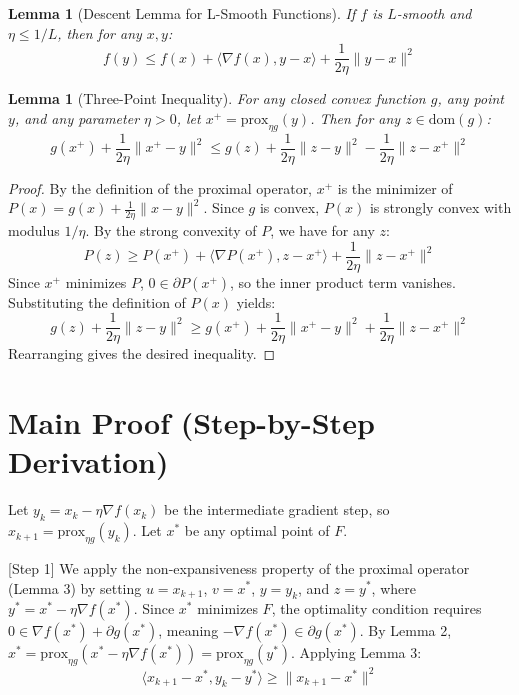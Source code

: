 \documentclass{article}
\newtheorem{lemma}[theorem]{Lemma}
\begin{document}
\begin{lemma}[Descent Lemma for L-Smooth Functions]
If $f$ is $L$-smooth and $\eta \leq 1/L$, then for any $x, y$:
\begin{equation}
f(y) \leq f(x) + \langle \nabla f(x), y - x \rangle + \frac{1}{2\eta} \|y - x\|^2
\end{equation}
\end{lemma}

\begin{lemma}[Three-Point Inequality]
For any closed convex function $g$, any point $y$, and any parameter $\eta > 0$, let $x^+ = \text{prox}_{\eta g}(y)$. Then for any $z \in \text{dom}(g)$:
\begin{equation}
g(x^+) + \frac{1}{2\eta}\|x^+ - y\|^2 \leq g(z) + \frac{1}{2\eta}\|z - y\|^2 - \frac{1}{2\eta}\|z - x^+\|^2
\end{equation}
\end{lemma}

\begin{proof}
By the definition of the proximal operator, $x^+$ is the minimizer of $P(x) = g(x) + \frac{1}{2\eta}\|x - y\|^2$. Since $g$ is convex, $P(x)$ is strongly convex with modulus $1/\eta$. By the strong convexity of $P$, we have for any $z$:
\begin{equation}
P(z) \geq P(x^+) + \langle \nabla P(x^+), z - x^+ \rangle + \frac{1}{2\eta}\|z - x^+\|^2
\end{equation}
Since $x^+$ minimizes $P$, $0 \in \partial P(x^+)$, so the inner product term vanishes. Substituting the definition of $P(x)$ yields:
\begin{equation}
g(z) + \frac{1}{2\eta}\|z - y\|^2 \geq g(x^+) + \frac{1}{2\eta}\|x^+ - y\|^2 + \frac{1}{2\eta}\|z - x^+\|^2
\end{equation}
Rearranging gives the desired inequality.
\end{proof}

\section*{Main Proof (Step-by-Step Derivation)}
Let $y_k = x_k - \eta \nabla f(x_k)$ be the intermediate gradient step, so $x_{k+1} = \text{prox}_{\eta g}(y_k)$. Let $x^*$ be any optimal point of $F$.

[Step 1] We apply the non-expansiveness property of the proximal operator (Lemma 3) by setting $u = x_{k+1}$, $v = x^*$, $y = y_k$, and $z = y^*$, where $y^* = x^* - \eta \nabla f(x^*)$. Since $x^*$ minimizes $F$, the optimality condition requires $0 \in \nabla f(x^*) + \partial g(x^*)$, meaning $-\nabla f(x^*) \in \partial g(x^*)$. By Lemma 2, $x^* = \text{prox}_{\eta g}(x^* - \eta \nabla f(x^*)) = \text{prox}_{\eta g}(y^*)$. Applying Lemma 3:
\begin{equation}
\langle x_{k+1} - x^*, y_k - y^* \rangle \geq \|x_{k+1} - x^*\|^2
\end{equation}
\end{document}

